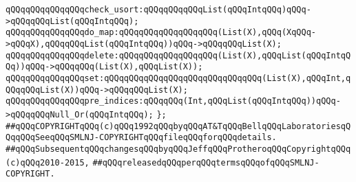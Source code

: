 \verb|qQQqqQQqqQQqqQQqcheck_usort:qQQqqQQqqQQqList(qQQqIntqQQq)qQQq->qQQqqQQqList(qQQqIntqQQq);|\newline
\newline
\verb|qQQqqQQqqQQqqQQqdo_map:qQQqqQQqqQQqqQQqqQQq(List(X),qQQq(XqQQq->qQQqX),qQQqqQQqList(qQQqIntqQQq))qQQq->qQQqqQQqList(X);|\newline
\verb|qQQqqQQqqQQqqQQqdelete:qQQqqQQqqQQqqQQqqQQq(List(X),qQQqList(qQQqIntqQQq))qQQq->qQQqqQQq(List(X),qQQqList(X));|\newline
\verb|qQQqqQQqqQQqqQQqset:qQQqqQQqqQQqqQQqqQQqqQQqqQQqqQQq(List(X),qQQqInt,qQQqqQQqList(X))qQQq->qQQqqQQqList(X);|\newline
\newline
\verb|qQQqqQQqqQQqqQQqpre_indices:qQQqqQQq(Int,qQQqList(qQQqIntqQQq))qQQq->qQQqqQQqNull_Or(qQQqIntqQQq);|\newline
\verb|};|\newline
\newline
\newline
\newline
\verb|##qQQqCOPYRIGHTqQQq(c)qQQq1992qQQqbyqQQqAT&TqQQqBellqQQqLaboratoriesqQQqqQQqSeeqQQqSMLNJ-COPYRIGHTqQQqfileqQQqforqQQqdetails.|\newline
\verb|##qQQqSubsequentqQQqchangesqQQqbyqQQqJeffqQQqProtheroqQQqCopyrightqQQq(c)qQQq2010-2015,|\newline
\verb|##qQQqreleasedqQQqperqQQqtermsqQQqofqQQqSMLNJ-COPYRIGHT.|\newline


